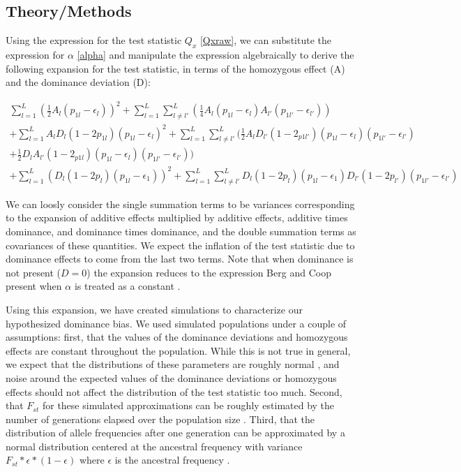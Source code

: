 \documentclass[a4paper,12pt]{article}
\begin{document}
\subsection*{Theory/Methods}



Using the expression for the test statistic $Q_x$ \eqref{Qxraw}, we
can substitute the expression for $\alpha$ \eqref{alpha} and manipulate
the expression algebraically to derive the following expansion for the
test statistic, in terms of the homozygous effect (A)  and the dominance
deviation (D):

\begin{equation}
  \begin{split}
  \sum^L_{l=1}( \frac{1}{2}A_l(p_{1l}-\epsilon_l))^2+\sum^L_{l=1}\sum^L_{
    l \neq l'}(\frac{1}{4}A_l(p_{1l}-\epsilon_{l})A_{l'}(p_{1l'}-\epsilon_{l'}))
  \\
  +\sum^L_{l=1}A_lD_l(1-2p_{1l})(p_{1l}-\epsilon_l)^2 +
  \sum^L_{l=1}\sum^L_{l \neq
    l'}(\frac{1}{2}A_lD_{l'}(1-2_{p1l'})(p_{1l}-\epsilon_l)(p_{1l'}-\epsilon_{l'}) \\
  + \frac{1}{2}D_lA_{l'}(1-2_{p1l})(p_{1l}-\epsilon_l)(p_{1l'}-\epsilon_{l'})) \\
   + \sum^L_{l=1} (D_l(1-2p_l)(p_{1l}-\epsilon_{1}))^2
   + \sum^L_{l=1}\sum^L_{l \neq
     l'}D_{l}(1-2p_{l})(p_{1l}-\epsilon_{1})D_{l'}(1-2p_{l'})(p_{1l'}-\epsilon_{l'}) \label{expansion}
  \end{split}
\end{equation}

We can loosly consider the single summation terms to be variances
corresponding to the expansion of additive effects multiplied by
additive effects, additive times dominance, and dominance times
dominance, and the double summation terms as covariances of these
quantities. We expect the inflation of the test statistic due to
dominance effects to come from the last two terms. Note that when
dominance is not present ($D=0$) the expansion reduces to the
expression Berg and Coop present when $\alpha$ is treated as a constant
\cite{berg}.

Using this expansion, we have created simulations to characterize our
hypothesized dominance bias. We used simulated populations
under a couple of assumptions: first, that the values of the dominance
deviations and homozygous effects are constant throughout the
population. While this is not true in general, we expect that the
distributions of these parameters are roughly normal
\cite{normaldist}, and noise around the expected values of the
dominance deviations or homozygous effects should not affect the distribution of the test statistic too
much. Second, that $F_{st}$ for these simulated approximations
can be roughly estimated by the number of generations elapsed over the
population size \cite{Fstest}. Third, that the distribution of allele frequencies after
one generation can be approximated by a normal distribution centered
at the ancestral frequency with variance
$F_{st}*\epsilon*(1-\epsilon)$ where $\epsilon$ is the ancestral
frequency \cite{gillespie}.
\end{document}
